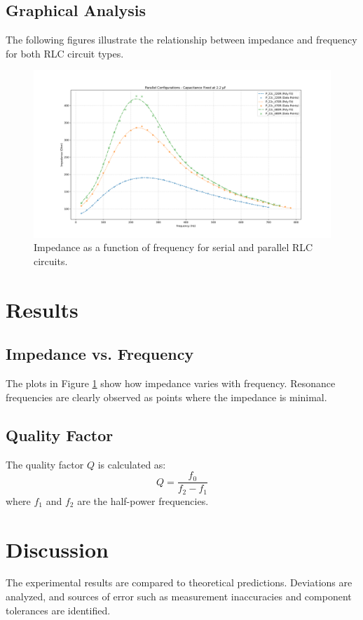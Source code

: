 \documentclass[journal]{IEEEtran}
\begin{document}
\subsection{Graphical Analysis}
The following figures illustrate the relationship between impedance and frequency for both RLC circuit types.

\begin{figure}[H]
    \centering
    \includegraphics[width=\linewidth]{output_plots/Fixed_C/Parallel.png}
    \caption{Impedance as a function of frequency for serial and parallel RLC circuits.}
    \label{fig:impedance}
\end{figure}

\section{Results}
\subsection{Impedance vs. Frequency}
The plots in Figure \ref{fig:impedance} show how impedance varies with frequency. Resonance frequencies are clearly observed as points where the impedance is minimal.

\subsection{Quality Factor}
The quality factor $Q$ is calculated as:
\begin{equation}
    Q = \frac{f_0}{f_2 - f_1}
\end{equation}
where $f_1$ and $f_2$ are the half-power frequencies.

\section{Discussion}
The experimental results are compared to theoretical predictions. Deviations are analyzed, and sources of error such as measurement inaccuracies and component tolerances are identified.
\end{document}
